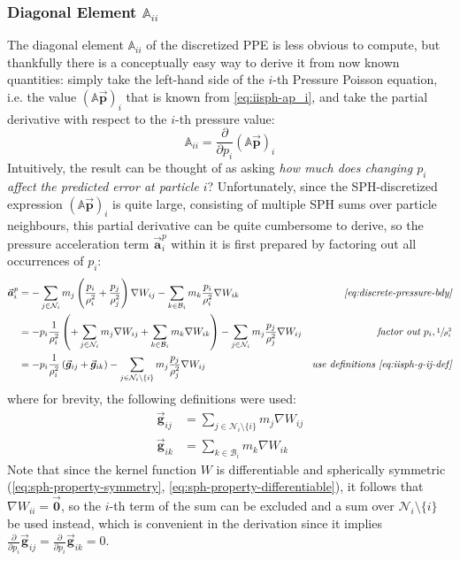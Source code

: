 \documentclass[oneside, a4paper]{book}
\newcommand\pdpi[0]{\frac{\partial}{\partial p_i}}
\newcommand\vek[1]{\vec{\bm{#1}}}
\newcommand\br[1]{\left(#1\right)}
\begin{document}
    \subsubsection{Diagonal Element $\mathds{A}_{ii}$}
    The diagonal element $\mathds{A}_{ii}$ of the discretized PPE is less obvious to compute, but thankfully there is a conceptually easy way to derive it from now known quantities: simply take the left-hand side of the $i$-th Pressure Poisson equation, i.e. the value $\br{\mathds{A}\vek{p}}_i$ that is known from \autoref{eq:iisph-ap_i}, and take the partial derivative with respect to the $i$-th pressure value:
    \begin{equation}
      \mathds{A}_{ii} = \pdpi \br{\mathds{A}\vek{p}}_i
    \end{equation}
    Intuitively, the result can be thought of as asking \textit{how much does changing $p_i$ affect the predicted error at particle $i$}? Unfortunately, since the SPH-discretized expression $\br{\mathds{A}\vek{p}}_i$ is quite large, consisting of multiple SPH sums over particle neighbours, this partial derivative can be quite cumbersome to derive, so the pressure acceleration term $\vek{a}_i^p$ within it is first prepared by factoring out all occurrences of $p_i$:
    \begin{align}
      \vek{a}_i^p &= -
      \sum_{j\in\mathcal{N}_i} 
        m_j \br{\frac{p_i}{\rho_i^2} + \frac{p_j}{\rho_j^2}} \nabla W_{ij} 
      -\sum_{k\in\mathcal{B}_i} 
        m_k\frac{p_i}{\rho_i^2} \nabla W_{ik} 
      &\textit{\autoref{eq:discrete-pressure-bdy}}\\
      &= -p_i \frac{1}{\rho_i^2}\br{
        +\sum_{j\in\mathcal{N}_i} 
        m_j \nabla W_{ij} 
        +\sum_{k\in\mathcal{B}_i} 
        m_k \nabla W_{ik} 
      }
      - \sum_{j\in\mathcal{N}_i} 
        m_j\frac{p_j}{\rho_j^2} \nabla W_{ij} 
      &\textit{factor out $p_i, \sfrac{1}{\rho_i^2}$}\\
      \label{eq:iisph-a-i}
      &= -p_i \frac{1}{\rho_i^2}\br{
        \vek{g}_{ij}
        +\vek{g}_{ik}
      }
      - \sum_{j\in\mathcal{N}_i\setminus \{i\}} 
        m_j\frac{p_j}{\rho_j^2} \nabla W_{ij} 
      &\textit{use definitions \autoref{eq:iisph-g-ij-def}}
    \end{align}
    where for brevity, the following definitions were used:
    \begin{align}
      \vek{g}_{ij} &= \sum_{j\in\mathcal{N}_i\setminus \{i\}}m_j \nabla W_{ij}\label{eq:iisph-g-ij-def} \\
      \vek{g}_{ik} &= \sum_{k\in\mathcal{B}_i} m_k \nabla W_{ik}
    \end{align}
    Note that since the kernel function $W$ is differentiable and spherically symmetric (\autoref{eq:sph-property-symmetry}, \autoref{eq:sph-property-differentiable}), it follows that $\nabla W_{ii}=\vek{0}$, so the $i$-th term of the sum can be excluded and a sum over $\mathcal{N}_i\setminus \{i\}$ be used instead, which is convenient in the derivation since it implies $\pdpi \vek{g}_{ij} = \pdpi \vek{g}_{ik} = 0$.
\end{document}
